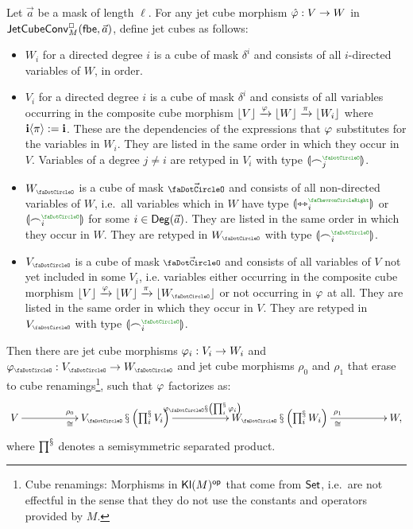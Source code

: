 \documentclass[a4paper]{memoir}
\begin{document}
\begin{theorem} \label{thm:sssfactorization}
	Let $\vec a$ be a mask of length $\ell$.
	For any jet cube morphism $\hat {\varphi} : V \to W$ in $\mathsf{JetCubeConv}^{\Box}_{M}\mathopen{}\left( {\mathsf{fbe}},\vec a \right)\mathclose{}$, define jet cubes as follows:
	\begin{itemize}
		\item $W_i$ for a directed degree $i$ is a cube of mask $\delta^i$ and consists of all $i$-directed variables of $W$, in order.
		\item $V_i$ for a directed degree $i$ is a cube of mask $\delta^i$ and consists of all variables occurring in the composite cube morphism $\mathopen{}\left\lfloor V \right\rfloor\mathclose{} \xrightarrow{\varphi} \mathopen{}\left\lfloor W \right\rfloor\mathclose{} \xrightarrow{\pi} \mathopen{}\left\lfloor W_i \right\rfloor\mathclose{}$ where $\mathbf{i} \langle \pi \rangle := \mathbf{i}$.
		These are the dependencies of the expressions that $\varphi$ substitutes for the variables in $W_i$.
		They are listed in the same order in which they occur in $V$.
		Variables of a degree $j \neq i$ are retyped in $V_i$ with type $\rival{\edge_j\pmr{\npolar}}$.
		\item $W_\npolar$ is a cube of mask $\vec \npolar$ and consists of all non-directed variables of $W$, i.e.\ all variables which in $W$ have type $\rival{\equijet_i\pmr{\ypolar}}$ or $\rival{\edge_i\pmr{\npolar}}$ for some $i \in {\mathsf{Deg}}(\vec a)$.
		They are listed in the same order in which they occur in $W$.
		They are retyped in $W_\npolar$ with type $\rival{\edgesym_i\pmr{\npolar}}$.
		\item $V_\npolar$ is a cube of mask $\vec \npolar$ and consists of all variables of $V$ not yet included in some $V_i$, i.e. variables either occurring in the composite cube morphism $\erasejc{V} \xrightarrow{\vfi} \erasejc{W} \xrightarrow{\pi} \erasejc{W_\npolar}$ or not occurring in $\varphi$ at all.
		They are listed in the same order in which they occur in $V$.
		They are retyped in $V_\npolar$ with type $\rival{\edgesym_i\pmr{\npolar}}$.
	\end{itemize}
	Then there are jet cube morphisms $\varphi_i : V_i \to W_i$ and $\vfi_\npolar : V_\npolar \to W_\npolar$ and jet cube morphisms $\rho_0$ and $\rho_1$ that erase to cube renamings\footnote{Cube renamings: Morphisms in ${\mathsf{Kl}}(M)^{\mathsf{op}}$ that come from ${\mathsf{Set}}$, i.e.\ are not effectful in the sense that they do not use the constants and operators provided by $M$.}, such that $\varphi$ factorizes as:
	\[
		\xymatrix{
			V
				\ar[rr]^{\rho_0}_\cong
			&& V_\npolar \sss \paren{\bigsss_i V_i}
				\ar[rr]^{\vfi_\npolar \sss \paren{\bigsss_i \vfi_i}}
			&& W_\npolar \sss \paren{\bigsss_i W_i}
				\ar[rr]^{\rho_1}_\cong
			&& W,
		}
	\]
	where $\prod^{\mathbin{\mathsection}}$ denotes a semisymmetric separated product.
\end{theorem}
\end{document}
